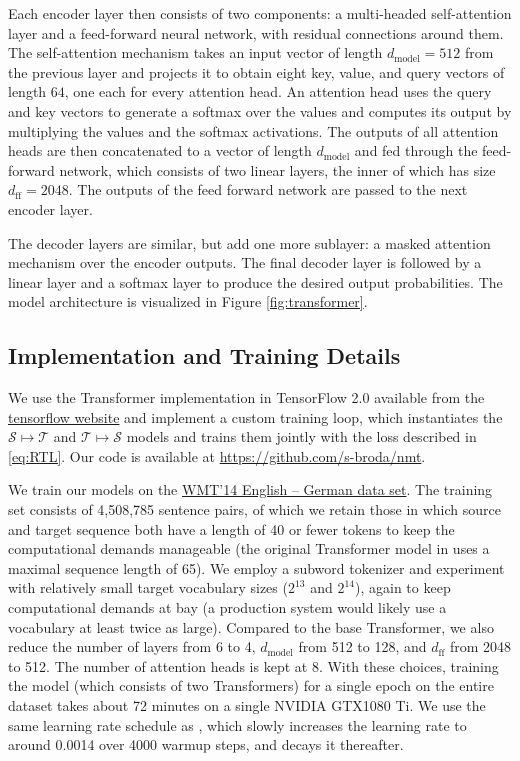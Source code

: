 \documentclass[10pt,a4paper]{article}
\begin{document}
Each encoder layer then consists of two components: a multi-headed self-attention layer and a feed-forward neural network, with residual connections around them. The self-attention mechanism takes an input vector of length $d_{\text{model}} = 512$ from the previous layer and projects it to obtain eight key, value, and query vectors of length $64$, one each for every attention head. An attention head uses the query and key vectors to generate a softmax over the values and computes its output by multiplying the values and the softmax activations. The outputs of all attention heads are then concatenated to a vector of length $d_{\text{model}}$ and fed through the feed-forward network, which consists of two linear layers, the inner of which has size $d_{\text{ff}} = 2048$. The outputs of the feed forward network are passed to the next encoder layer.


The decoder layers are similar, but add one more sublayer: a masked attention mechanism over the encoder outputs. The final decoder layer is followed by a linear layer and a softmax layer to produce the desired output probabilities. The model architecture is visualized in Figure \ref{fig:transformer}.

\subsection{Implementation and Training Details}
We use the Transformer implementation in TensorFlow 2.0 available from the \href{https://www.tensorflow.org/tutorials/text/transformer}{tensorflow website} and implement a custom training loop, which instantiates the $\mathcal{S}\mapsto\mathcal{T}$ and $\mathcal{T}\mapsto\mathcal{S}$ models and trains them jointly with the loss described in \eqref{eq:RTL}. Our code is available at \href{https://github.com/s-broda/nmt}{https://github.com/s-broda/nmt}. 

We train our models on the \href{https://nlp.stanford.edu/projects/nmt/}{WMT'14 English -- German data set}. The training set consists of 4,508,785 sentence pairs, of which we retain those in which source and target sequence both have a length of 40 or fewer tokens to keep the computational demands manageable (the original Transformer model in \citet{transformer} uses a maximal sequence length of 65). We employ a subword tokenizer and experiment with relatively small target vocabulary sizes ($2^{13}$ and $2^{14}$), again to keep computational demands at bay (a production system would likely use a vocabulary at least twice as large). Compared to the base Transformer, we also reduce the number of layers from 6 to 4, $d_{\text{model}}$ from 512 to 128, and $d_{\text{ff}}$ from 2048 to 512. The number of attention heads is kept at 8.
With these choices, training the model (which consists of two Transformers) for a single epoch on the entire dataset takes about 72 minutes on a single NVIDIA GTX1080 Ti. We use the same learning rate schedule as \cite{transformer}, which slowly increases the learning rate to around 0.0014 over 4000 warmup steps, and decays it thereafter.
\end{document}
